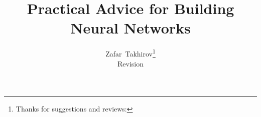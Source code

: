 

\title{Practical Advice for Building Neural Networks}
\author{
  Zafar~Takhirov\thanks{Thanks for suggestions and reviews: \Contributors}\\
  Revision \Version
}

